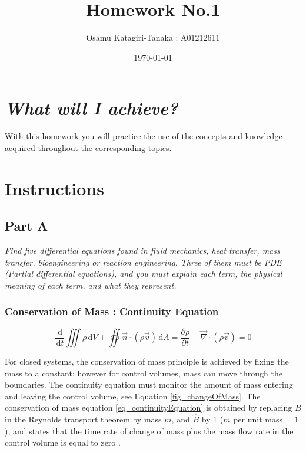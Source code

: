 \documentclass{article}
\title{Homework No.1}
\author{Osamu Katagiri-Tanaka : A01212611}
\date{\today}
\newcommand{\ud}{\,\mathrm{d}}
\begin{document}
\maketitle

\section*{\emph{What will I achieve?}}
With this homework you will practice the use of the concepts and knowledge acquired throughout the corresponding topics.

\section*{Instructions}

\subsection*{Part A}
\textit{Find five differential equations found in fluid mechanics, heat transfer, mass transfer, bioengineering or reaction engineering. Three of them must be PDE (Partial differential equations), and you must explain each term, the physical meaning of each term, and what they represent.}

\subsubsection*{Conservation of Mass : Continuity Equation}

\begin{equation}
\frac{\ud}{\ud t} \iiint \rho \ud V + \oiint \vec{n} \cdot (\rho \vec{v}) \ud A = \frac{\partial \rho}{\partial t} + \vec{\nabla} \cdot (\rho \vec{v}) = 0
\label{eq_continuityEquation}
\end{equation}

For closed systems, the conservation of mass principle is achieved by fixing the mass to a constant; however for control volumes, mass can move through the boundaries. The continuity equation must monitor the amount of mass entering and leaving the control volume, see Equation \ref{fig_changeOfMass}. The conservation of mass equation \ref{eq_continuityEquation} is obtained by replacing $B$ in the Reynolds transport theorem by mass $m$, and $\hat{B}$ by 1 ($m$ per unit mass = $1$), and states that the time rate of change of mass plus the mass flow rate in the control volume is equal to zero \cite{White2011, Moukalled2016}.
\end{document}
